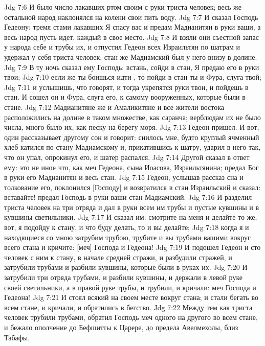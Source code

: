 \vs Jdg 7:6 И было число лакавших ртом своим с руки триста человек; весь же остальной народ наклонялся на колени свои пить воду.
\vs Jdg 7:7 И сказал Господь Гедеону: тремя стами лакавших Я спасу вас и предам Мадианитян в руки ваши, а весь народ пусть идет, каждый в свое место.
\vs Jdg 7:8 И взяли они съестной запас у народа себе и трубы их, и отпустил Гедеон всех Израильтян по шатрам и удержал у себя триста человек; стан же Мадиамский был у него внизу в долине.
\rsbpar\vs Jdg 7:9 В ту ночь сказал ему Господь: встань, сойди в стан, Я предаю его в руки твои;
\vs Jdg 7:10 если же ты боишься идти , то пойди в стан ты и Фура, слуга твой;
\vs Jdg 7:11 и услышишь, что говорят, и тогда укрепятся руки твои, и пойдешь в стан. И сошел он и Фура, слуга его, к самому  вооруженных, которые были в стане.
\vs Jdg 7:12 Мадианитяне же и Амаликитяне и все жители востока расположились на долине в таком множестве, как саранча; верблюдам их не было числа, много было их, как песку на берегу моря.
\vs Jdg 7:13 Гедеон пришел. И вот, один рассказывает другому сон и говорит: снилось мне, будто круглый ячменный хлеб катился по стану Мадиамскому и, прикатившись к шатру, ударил в него так, что он упал, опрокинул его, и шатер распался.
\vs Jdg 7:14 Другой сказал в ответ ему: это не иное что, как меч Гедеона, сына Иоасова, Израильтянина; предал Бог в руки его Мадианитян и весь стан.
\vs Jdg 7:15 Гедеон, услышав рассказ сна и толкование его, поклонился [Господу] и возвратился в стан Израильский и сказал: вставайте! предал Господь в руки ваши стан Мадиамский.
\vs Jdg 7:16 И разделил триста человек на три отряда и дал в руки всем им трубы и пустые кувшины и в кувшины светильники.
\vs Jdg 7:17 И сказал им: смотрите на меня и делайте то же; вот, я подойду к стану, и что буду делать, то и вы делайте;
\vs Jdg 7:18 когда я и находящиеся со мною затрубим трубою, трубите и вы трубами вашими вокруг всего стана и кричите: [меч] Господа и Гедеона!
\vs Jdg 7:19 И подошел Гедеон и сто человек с ним к стану, в начале средней стражи, и разбудили стражей, и затрубили трубами и разбили кувшины, которые были в руках их.
\vs Jdg 7:20 И затрубили  три отряда трубами, и разбили кувшины, и держали в левой руке своей светильники, а в правой руке трубы, и трубили, и кричали: меч Господа и Гедеона!
\vs Jdg 7:21 И стоял всякий на своем месте вокруг стана; и стали бегать во всем стане, и кричали, и обратились в бегство.
\vs Jdg 7:22 Между тем как триста человек трубили трубами, обратил Господь меч одного на другого во всем стане, и бежало ополчение до Бефшитты к Царере, до предела Авелмехолы, близ Табафы.
